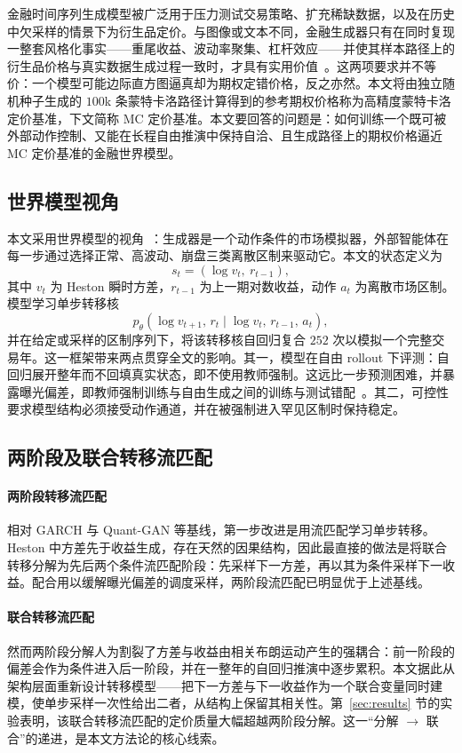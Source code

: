 \documentclass[11pt]{ctexart}
\begin{document}
金融时间序列生成模型被广泛用于压力测试交易策略、扩充稀缺数据，以及在历史中欠采样的情景下为衍生品定价。与图像或文本不同，金融生成器只有在同时复现一整套风格化事实——重尾收益、波动率聚集、杠杆效应——并使其样本路径上的衍生品价格与真实数据生成过程一致时，才具有实用价值~\citep{cont2001empirical}。这两项要求并不等价：一个模型可能边际直方图逼真却为期权定错价格，反之亦然。本文将由独立随机种子生成的 $100$k 条蒙特卡洛路径计算得到的参考期权价格称为高精度蒙特卡洛定价基准，下文简称 MC 定价基准。本文要回答的问题是：如何训练一个既可被外部动作控制、又能在长程自由推演中保持自洽、且生成路径上的期权价格逼近 MC 定价基准的金融世界模型。

\subsection{世界模型视角}
本文采用世界模型的视角~\citep{ha2018world,alonso2024diamond}：生成器是一个动作条件的市场模拟器，外部智能体在每一步通过选择正常、高波动、崩盘三类离散区制来驱动它。本文的状态定义为
\[
s_t=(\log v_t,\ r_{t-1}),
\]
其中 $v_t$ 为 Heston 瞬时方差，$r_{t-1}$ 为上一期对数收益，动作 $a_t$ 为离散市场区制。模型学习单步转移核
\[
p_\theta(\log v_{t+1},\,r_t\mid \log v_t,\,r_{t-1},\,a_t),
\]
并在给定或采样的区制序列下，将该转移核自回归复合 $252$ 次以模拟一个完整交易年。这一框架带来两点贯穿全文的影响。其一，模型在自由 rollout 下评测：自回归展开整年而不回填真实状态，即不使用教师强制。这远比一步预测困难，并暴露曝光偏差，即教师强制训练与自由生成之间的训练与测试错配~\citep{bengio2015scheduled}。其二，可控性要求模型结构必须接受动作通道，并在被强制进入罕见区制时保持稳定。

\subsection{两阶段及联合转移流匹配}
\label{sec:progressive}

\paragraph{两阶段转移流匹配}
相对 GARCH 与 Quant-GAN 等基线，第一步改进是用流匹配学习单步转移。Heston 中方差先于收益生成，存在天然的因果结构，因此最直接的做法是将联合转移分解为先后两个条件流匹配阶段：先采样下一方差，再以其为条件采样下一收益。配合用以缓解曝光偏差的调度采样，两阶段流匹配已明显优于上述基线。

\paragraph{联合转移流匹配}
然而两阶段分解人为割裂了方差与收益由相关布朗运动产生的强耦合：前一阶段的偏差会作为条件进入后一阶段，并在一整年的自回归推演中逐步累积。本文据此从架构层面重新设计转移模型——把下一方差与下一收益作为一个联合变量同时建模，使单步采样一次性给出二者，从结构上保留其相关性。第~\ref{sec:results} 节的实验表明，该联合转移流匹配的定价质量大幅超越两阶段分解。这一“分解 $\to$ 联合”的递进，是本文方法论的核心线索。
\end{document}
